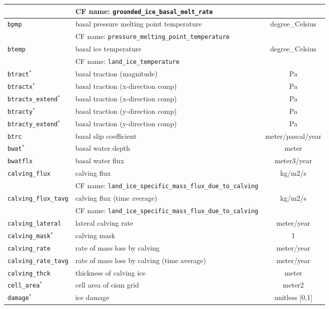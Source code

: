 \begin{center}
\begin{supertabular}{|l|p{8cm}|c|}
&CF name: \texttt{grounded\_ice\_basal\_melt\_rate}&\\
\hline
\texttt{bpmp} & basal pressure melting point temperature & degree\_Celsius\\
&CF name: \texttt{pressure\_melting\_point\_temperature}&\\
\hline
\texttt{btemp} & basal ice temperature & degree\_Celsius\\
&CF name: \texttt{land\_ice\_temperature}&\\
\hline
\texttt{btract}$^\ast$ & basal traction (magnitude) & Pa\\
\hline
\texttt{btractx}$^\ast$ & basal traction (x-direction comp) & Pa\\
\hline
\texttt{btractx\_extend}$^\ast$ & basal traction (x-direction comp) & Pa\\
\hline
\texttt{btracty}$^\ast$ & basal traction (y-direction comp) & Pa\\
\hline
\texttt{btracty\_extend}$^\ast$ & basal traction (y-direction comp) & Pa\\
\hline
\texttt{btrc} & basal slip coefficient & meter/pascal/year\\
\hline
\texttt{bwat}$^\ast$ & basal water depth & meter\\
\hline
\texttt{bwatflx} & basal water flux & meter3/year\\
\hline
\texttt{calving\_flux} & calving flux & kg/m2/s\\
&CF name: \texttt{land\_ice\_specific\_mass\_flux\_due\_to\_calving}&\\
\hline
\texttt{calving\_flux\_tavg} & calving flux (time average) & kg/m2/s\\
&CF name: \texttt{land\_ice\_specific\_mass\_flux\_due\_to\_calving}&\\
\hline
\texttt{calving\_lateral} & lateral calving rate & meter/year\\
\hline
\texttt{calving\_mask}$^\ast$ & calving mask & 1\\
\hline
\texttt{calving\_rate} & rate of mass loss by calving & meter/year\\
\hline
\texttt{calving\_rate\_tavg} & rate of mass loss by calving (time average) & meter/year\\
\hline
\texttt{calving\_thck} & thickness of calving ice & meter\\
\hline
\texttt{cell\_area}$^\ast$ & cell area of cism grid & meter2\\
\hline
\texttt{damage}$^\ast$ & ice damage & unitless [0,1]\\

\end{supertabular}
\end{center}
